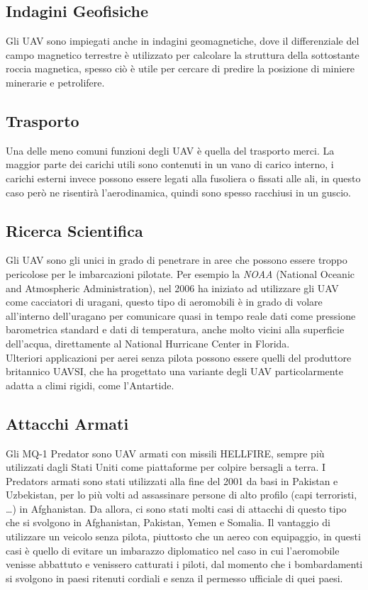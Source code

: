 \subsection*{Indagini Geofisiche}
Gli \ac{UAV} sono impiegati anche in indagini geomagnetiche, dove il differenziale del campo magnetico terrestre è utilizzato
per calcolare la struttura della sottostante roccia magnetica, spesso ciò è utile per cercare di predire la posizione di
miniere minerarie e petrolifere.

\subsection*{Trasporto}
Una delle meno comuni funzioni degli \ac{UAV} è quella del trasporto merci. La maggior parte dei carichi utili sono contenuti in un 
vano di carico interno, i carichi esterni invece possono essere legati alla fusoliera o fissati alle ali, in questo caso però ne
risentirà l'aerodinamica, quindi sono spesso racchiusi in un guscio.

\subsection*{Ricerca Scientifica}
Gli \ac{UAV} sono gli unici in grado di penetrare in aree che possono essere troppo pericolose per le imbarcazioni pilotate.
Per esempio la \emph{NOAA} (National Oceanic and Atmospheric Administration), nel 2006 ha iniziato ad utilizzare gli \ac{UAV} come
cacciatori di uragani, questo tipo di aeromobili è in grado di volare all'interno dell'uragano per comunicare quasi in tempo 
reale dati come pressione barometrica standard e dati di temperatura, anche molto vicini alla superficie dell'acqua,
direttamente al National Hurricane Center in Florida. \\ 
Ulteriori applicazioni per aerei senza pilota possono essere quelli del produttore britannico UAVSI, che ha progettato una
variante degli \ac{UAV} particolarmente adatta a climi rigidi, come l'Antartide.

\subsection*{Attacchi Armati}
Gli MQ-1 Predator sono \ac{UAV} armati con missili \ac{HELLFIRE}, 
sempre più utilizzati dagli Stati Uniti come piattaforme per colpire bersagli a terra. I Predators armati sono stati utilizzati 
alla fine del 2001 da basi in Pakistan e Uzbekistan, per lo più volti ad assassinare persone di alto profilo 
(capi terroristi, \dots) in Afghanistan. Da allora, ci sono stati molti casi di attacchi di questo tipo che si svolgono 
in Afghanistan, Pakistan, Yemen e Somalia. Il vantaggio di utilizzare un veicolo senza pilota, 
piuttosto che un aereo con equipaggio, in questi casi è quello di evitare un imbarazzo diplomatico nel caso in cui l'aeromobile 
venisse abbattuto e venissero catturati i piloti, dal momento che i bombardamenti si svolgono in paesi ritenuti cordiali e 
senza il permesso ufficiale di quei paesi.

